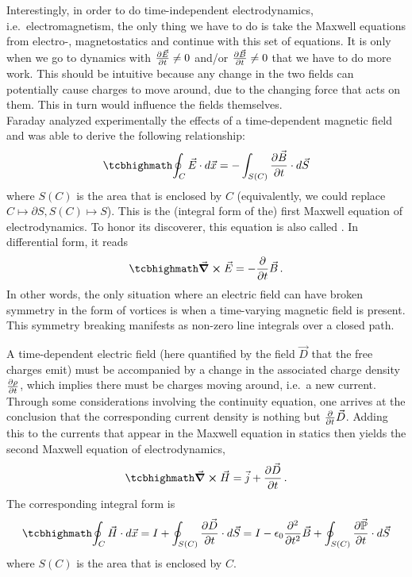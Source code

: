 \documentclass[../class_mech_main.tex]{subfiles}
\begin{document}
Interestingly, in order to do time-independent electrodynamics, i.e.~electromagnetism, the only thing we have to do is take the Maxwell equations from electro-, magnetostatics and continue with this set of equations. It is only when we go to dynamics with $\pdv{\vec{E}}{t} \neq 0$ and/or $\pdv{\vec{B}}{t} \neq 0$ that we have to do more work. This should be intuitive because any change in the two fields can potentially cause charges to move around, due to the changing force that acts on them. This in turn would influence the fields themselves.\\


Faraday analyzed experimentally the effects of a time-dependent magnetic field and was able to derive the following relationship:
\begin{equation}\label{eq:maxwell_edyn_one_int}
    \eqbox{
        \oint_C \vec{E} \cdot d\vec{x} = - \int_{S(C)} \pdv{\vec{B}}{t} \cdot d\vec{S}
    }
\end{equation}
where $S(C)$ is the area that is enclosed by $C$ (equivalently, we could replace $C \mapsto \partial S, S(C) \mapsto S$). This is the (integral form of the) first Maxwell equation of electrodynamics. To honor its discoverer, this equation is also called . In differential form, it reads
\begin{equation}\label{eq:maxwell_edyn_one_diff}
    \eqbox{
        \curl \vec{E} = - \pdv{t} \vec{B}
    } \, .
\end{equation}
In other words, the only situation where an electric field can have broken symmetry in the form of vortices is when a time-varying magnetic field is present. This symmetry breaking manifests as non-zero line integrals over a closed path.


A time-dependent electric field (here quantified by the field $\vec{D}$ that the free charges emit) must be accompanied by a change in the associated charge density $\pdv{\rho}{t}$, which implies there must be charges moving around, i.e.~a new current. Through some considerations involving the continuity equation, one arrives at the conclusion that the corresponding current density is nothing but $\pdv{t} \vec{D}$. Adding this to the currents that appear in the Maxwell equation in statics then yields the second Maxwell equation of electrodynamics,
\begin{equation}\label{eq:maxwell_edyn_two_diff}
    \eqbox{
        \curl \vec{H} = \vec{j} + \pdv{\vec{D}}{t}
    } \, .
\end{equation}
The corresponding integral form is 
\begin{equation}\label{eq:maxwell_edyn_two_int}
    \eqbox{
        \oint_C \vec{H} \cdot d\vec{x} = I + \oint_{S(C)} \pdv{\vec{D}}{t} \cdot d\vec{S} = I - \epsilon_0 \pdv[2]{t} \vec{B} + \oint_{S(C)} \pdv{\vec{\mathbb{P}}}{t} \cdot d\vec{S}
    }
\end{equation}
where $S(C)$ is the area that is enclosed by $C$.
\end{document}
